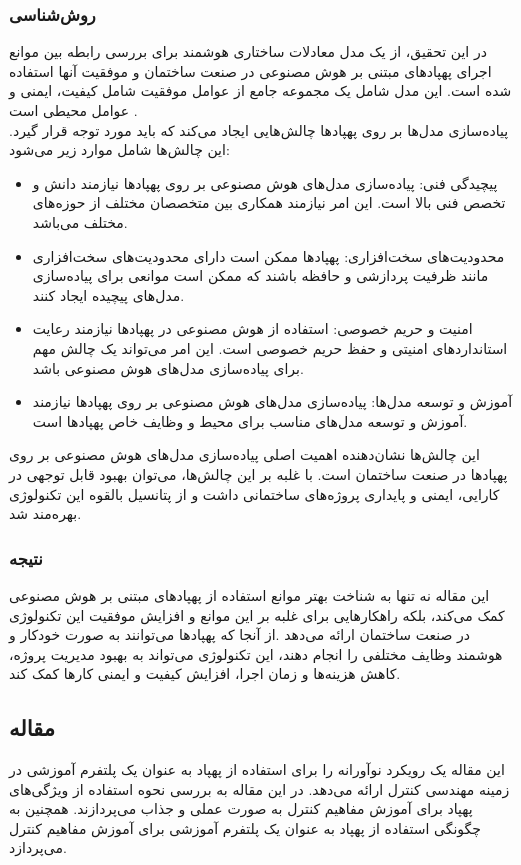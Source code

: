 \subsubsection{روش‌شناسی}
در این تحقیق، از یک مدل معادلات ساختاری هوشمند برای بررسی رابطه بین موانع اجرای پهپادهای مبتنی بر هوش مصنوعی در صنعت ساختمان و موفقیت آنها استفاده شده است.
این مدل شامل یک مجموعه جامع از عوامل موفقیت شامل کیفیت، ایمنی و عوامل محیطی است .
\\
پیاده‌سازی مدل‌ها بر روی پهپادها چالش‌هایی ایجاد می‌کند که باید مورد توجه قرار گیرد. این چالش‌ها شامل موارد زیر می‌شود:
\begin{itemize}
    \item پیچیدگی فنی: پیاده‌سازی مدل‌های هوش مصنوعی بر روی پهپادها نیازمند دانش و تخصص فنی بالا است. این امر نیازمند همکاری بین متخصصان مختلف از حوزه‌های مختلف می‌باشد.
    \item محدودیت‌های سخت‌افزاری: پهپادها ممکن است دارای محدودیت‌های سخت‌افزاری مانند ظرفیت پردازشی و حافظه باشند که ممکن است موانعی برای پیاده‌سازی مدل‌های پیچیده ایجاد کنند.
    \item امنیت و حریم خصوصی: استفاده از هوش مصنوعی در پهپادها نیازمند رعایت استانداردهای امنیتی و حفظ حریم خصوصی است. این امر می‌تواند یک چالش مهم برای پیاده‌سازی مدل‌های هوش مصنوعی باشد.
    \item آموزش و توسعه مدل‌ها: پیاده‌سازی مدل‌های هوش مصنوعی بر روی پهپادها نیازمند آموزش و توسعه مدل‌های مناسب برای محیط و وظایف خاص پهپادها است.
\end{itemize}
این چالش‌ها نشان‌دهنده اهمیت اصلی پیاده‌سازی مدل‌های هوش مصنوعی بر روی پهپادها در صنعت ساختمان است. با غلبه بر این چالش‌ها، می‌توان بهبود 
قابل توجهی در کارایی، ایمنی و پایداری پروژه‌های ساختمانی داشت و از پتانسیل بالقوه این تکنولوژی بهره‌مند شد.
\subsubsection{نتیجه}
این مقاله نه تنها به شناخت بهتر موانع استفاده از پهپادهای مبتنی بر هوش مصنوعی کمک می‌کند، بلکه راهکارهایی برای غلبه بر این موانع و افزایش موفقیت این تکنولوژی در صنعت ساختمان ارائه می‌دهد .از آنجا که
پهپادها می‌توانند به صورت خودکار و هوشمند وظایف مختلفی را انجام دهند، این تکنولوژی می‌تواند به بهبود مدیریت پروژه، کاهش هزینه‌ها و زمان اجرا، افزایش کیفیت و ایمنی کارها کمک کند.
\cite{waqar2023modeling}


\subsection{مقاله }
این مقاله یک رویکرد نوآورانه را برای استفاده از پهپاد  به عنوان یک پلتفرم آموزشی در زمینه مهندسی کنترل ارائه می‌دهد. در این مقاله به بررسی نحوه استفاده از ویژگی‌های پهپاد برای 
آموزش مفاهیم کنترل به صورت عملی و جذاب می‌پردازند. همچنین به چگونگی استفاده از پهپاد  به عنوان یک پلتفرم آموزشی برای آموزش مفاهیم کنترل می‌پردازد.

